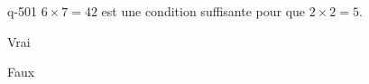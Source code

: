 \begin{truefalse}{q-501}
$6\times 7 = 42 $ est une condition suffisante pour que $2\times 2=5$.
\item Vrai
\item* Faux
\end{truefalse}


